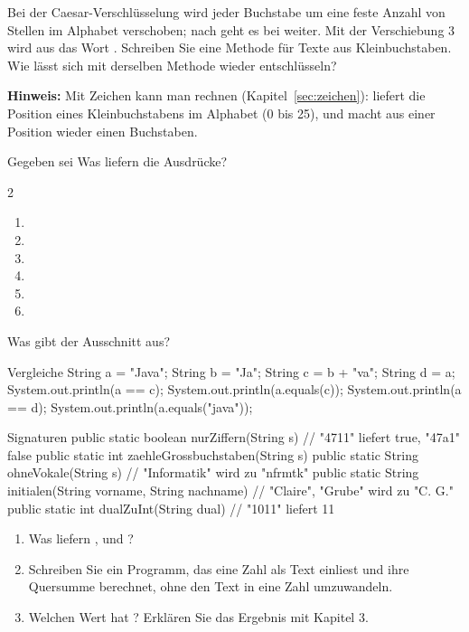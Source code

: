 Bei der Caesar-Verschlüsselung wird jeder Buchstabe um eine feste Anzahl von Stellen im Alphabet verschoben; nach  geht es bei  weiter. Mit der Verschiebung 3 wird aus  das Wort . Schreiben Sie eine Methode  für Texte aus Kleinbuchstaben. Wie lässt sich mit derselben Methode wieder entschlüsseln?
\begin{hinweis}
\textbf{Hinweis:} Mit Zeichen kann man rechnen (Kapitel~\ref{sec:zeichen}):  liefert die Position eines Kleinbuchstabens im Alphabet (0 bis 25), und  macht aus einer Position wieder einen Buchstaben.
\end{hinweis}

\ueben
{}
Gegeben sei  Was liefern die Ausdrücke?
\begin{multicols}{2}
\begin{enumerate}[label=\alph*)]
\item {}
\item {}
\item {}
\item {}
\item {}
\item {}
\end{enumerate}
\end{multicols}

Was gibt der Ausschnitt aus?
\begin{javacode}[Ausschnitt]{Vergleiche}
String a = "Java";
String b = "Ja";
String c = b + "va";
String d = a;
System.out.println(a == c);
System.out.println(a.equals(c));
System.out.println(a == d);
System.out.println(a.equals("java"));
\end{javacode}

\begin{javacode}[Ausschnitt]{Signaturen}
public static boolean nurZiffern(String s)          // "4711" liefert true, "47a1" false
public static int zaehleGrossbuchstaben(String s)
public static String ohneVokale(String s)           // "Informatik" wird zu "nfrmtk"
public static String initialen(String vorname, String nachname)    // "Claire", "Grube" wird zu "C. G."
public static int dualZuInt(String dual)            // "1011" liefert 11
\end{javacode}

\begin{enumerate}[label=\alph*)]
\item Was liefern ,  und ?
\item Schreiben Sie ein Programm, das eine Zahl als Text einliest und ihre Quersumme berechnet, ohne den Text in eine Zahl umzuwandeln.
\item Welchen Wert hat ? Erklären Sie das Ergebnis mit Kapitel 3.
\end{enumerate}
